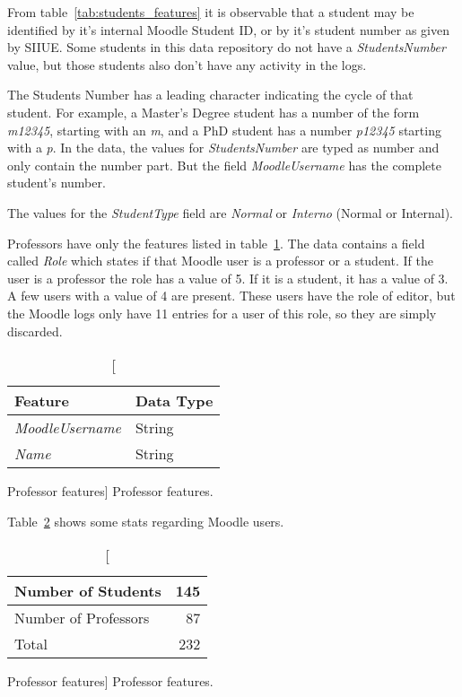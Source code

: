 From table~\ref{tab:students_features} it is observable that a student may be
identified by it's internal Moodle Student ID, or by it's student number as
given by SIIUE. Some students in this data repository do not have a
\textit{StudentsNumber} value, but those students also don't have any activity
in the logs.

The Students Number has a leading character indicating the cycle of that
student. For example, a Master's Degree student has a number of the form
\textit{m12345}, starting with an \textit{m}, and a PhD student has a number
\textit{p12345} starting with a \textit{p}. In the data, the values for
\textit{StudentsNumber} are typed as number and only contain the number part.
But the field \textit{MoodleUsername} has the complete student's number.

The values for the \textit{StudentType} field are \textit{Normal} or
\textit{Interno} (Normal or Internal).

Professors have only the features listed in table~\ref{tab:professor_features}.
The data contains a field called \textit{Role} which states if that Moodle user
is a professor or a student. If the user is a professor the role has a value of
5. If it is a student, it has a value of 3. A few users with a value of 4 are
present. These users have the role of editor, but the Moodle logs only have 11
entries for a user of this role, so they are simply discarded.

\begin{table}[h!]
    \centering

    \begin{tabular}{l l}
        Feature                 & Data Type \\ \hline
        \textit{MoodleUsername} & String    \\
        \textit{Name}           & String    \\
    \end{tabular}

    \caption
        [Professor features]
        {Professor features.}

    \label{tab:professor_features}
\end{table}

Table~\ref{tab:moodle_users_stats} shows some stats regarding Moodle users.

\begin{table}[h!]
    \centering

    \begin{tabular}{| l | r |}
        \hline
        Number of Students   & 145 \\ \hline
        Number of Professors & 87  \\ \hline
        Total                & 232 \\ \hline
    \end{tabular}

    \caption
        [Professor features]
        {Professor features.}

    \label{tab:moodle_users_stats}
\end{table}

